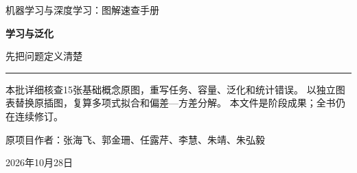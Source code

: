 \documentclass[a4paper,11pt,oneside,openany]{book}
\begin{document}
\frontmatter
\hypersetup{pageanchor=false}
\begin{titlepage}
\vspace*{16mm}
{\sffamily\color{Teal}\large 机器学习与深度学习：图解速查手册\par}
\vspace{15mm}
{\sffamily\bfseries\color{Ink}\Huge 学习与泛化\par}
\vspace{6mm}
{\sffamily\color{Ink}\LARGE 先把问题定义清楚\par}
\vspace{12mm}
\noindent\textcolor{Teal}{\rule{\textwidth}{1.2pt}}
\vspace{7mm}
\begin{keyidea}[第五批阶段样章]
本批详细核查15张基础概念原图，重写任务、容量、泛化和统计错误。
以独立图表替换原插图，复算多项式拟合和偏差—方差分解。
本文件是阶段成果；全书仍在连续修订。
\end{keyidea}
\vfill
原项目作者：张海飞、郭金珊、任露芹、李慧、朱靖、朱弘毅\par
\vspace{4mm}
2026年10月28日\par
\end{titlepage}
\hypersetup{pageanchor=true}
\tableofcontents
\mainmatter
\setcounter{chapter}{4}

\end{document}
